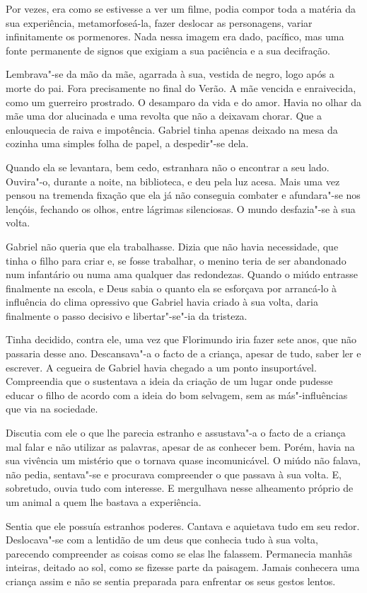 Por vezes, era como se estivesse a ver um filme, podia compor toda a
matéria da sua experiência, metamorfoseá-la, fazer deslocar as
personagens, variar infinitamente os pormenores. Nada nessa imagem era
dado, pacífico, mas uma fonte permanente de signos que exigiam a sua
paciência e a sua decifração.

Lembrava"-se da mão da mãe, agarrada à sua, vestida de negro, logo após a
morte do pai. Fora precisamente no final do Verão. A mãe vencida e
enraivecida, como um guerreiro prostrado. O desamparo da vida e do amor.
Havia no olhar da mãe uma dor alucinada e uma revolta que não a deixavam
chorar. Que a enlouquecia de raiva e impotência. Gabriel tinha apenas
deixado na mesa da cozinha uma simples folha de papel, a despedir"-se
dela.

Quando ela se levantara, bem cedo, estranhara não o encontrar a seu
lado. Ouvira"-o, durante a noite, na biblioteca, e deu pela luz acesa.
Mais uma vez pensou na tremenda fixação que ela já não conseguia
combater e afundara"-se nos lençóis, fechando os olhos, entre lágrimas
silenciosas. O mundo desfazia"-se à sua volta.

Gabriel não queria que ela trabalhasse. Dizia que não havia necessidade,
que tinha o filho para criar e, se fosse trabalhar, o menino teria de
ser abandonado num infantário ou numa ama qualquer das redondezas.
Quando o miúdo entrasse finalmente na escola, e Deus sabia o quanto ela
se esforçava por arrancá-lo à influência do clima opressivo que Gabriel
havia criado à sua volta, daria finalmente o passo decisivo e
libertar"-se"-ia da tristeza.

Tinha decidido, contra ele, uma vez que Florimundo iria fazer sete anos,
que não passaria desse ano. Descansava"-a o facto de a criança, apesar de
tudo, saber ler e escrever. A cegueira de Gabriel havia chegado a um
ponto insuportável. Compreendia que o sustentava a ideia da criação de
um lugar onde pudesse educar o filho de acordo com a ideia do bom
selvagem, sem as más"-influências que via na sociedade.

Discutia com ele o que lhe parecia estranho e assustava"-a o facto de a
criança mal falar e não utilizar as palavras, apesar de as conhecer bem.
Porém, havia na sua vivência um mistério que o tornava quase
incomunicável. O miúdo não falava, não pedia, sentava"-se e procurava
compreender o que passava à sua volta. E, sobretudo, ouvia tudo com
interesse. E mergulhava nesse alheamento próprio de um animal a quem lhe
bastava a experiência.

Sentia que ele possuía estranhos poderes. Cantava e aquietava tudo em
seu redor. Deslocava"-se com a lentidão de um deus que conhecia tudo à
sua volta, parecendo compreender as coisas como se elas lhe falassem.
Permanecia manhãs inteiras, deitado ao sol, como se fizesse parte da
paisagem. Jamais conhecera uma criança assim e não se sentia preparada
para enfrentar os seus gestos lentos.

